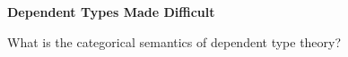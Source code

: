 \documentclass[
  xcolor={usenames,dvipsnames,svgnames},
  ]{beamer}
\begin{document}

{
\begin{frame}
  \begin{center}
    \vfill\vfill
    \fontsize{40pt}{20pt}\textbf{Dependent Types Made Difficult}
    \vfill\vfill
  \end{center}
\end{frame}
}

%
%
%


\begin{frame}{}
    \begin{center}
      \Large \color{black}
      What is the categorical semantics of dependent type theory?
    \end{center}
\end{frame}
\end{document}
